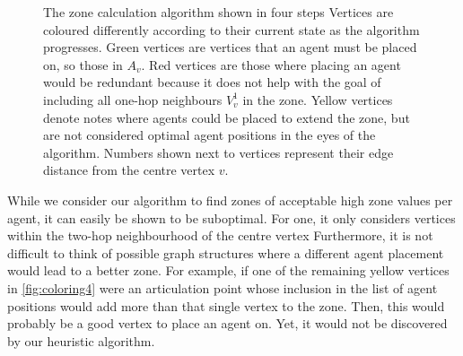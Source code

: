 \begin{figure}
  \caption{The zone calculation algorithm shown in four steps
           Vertices are coloured differently according to their current state as the algorithm progresses.
           Green vertices are vertices that an agent must be placed on, so those in $A_v$.
           Red vertices are those where placing an agent would be redundant because it does not help with the goal of including all one-hop neighbours $V_v^1$ in the zone.
           Yellow vertices denote notes where agents could be placed to extend the zone, but are not considered optimal agent positions in the eyes of the algorithm.
           Numbers shown next to vertices represent their edge distance from the centre vertex $v$.}
  \label{fig:coloring}
\end{figure}
While we consider our algorithm to find zones of acceptable high zone values per agent, it can easily be shown to be suboptimal.
For one, it only considers vertices within the two-hop neighbourhood of the centre vertex
Furthermore, it is not difficult to think of possible graph structures where a different agent placement would lead to a better zone.
For example, if one of the remaining yellow vertices in \autoref{fig:coloring4} were an articulation point whose inclusion in the list of agent positions would add more than that single vertex to the zone.
Then, this would probably be a good vertex to place an agent on.
Yet, it would not be discovered by our heuristic algorithm.
